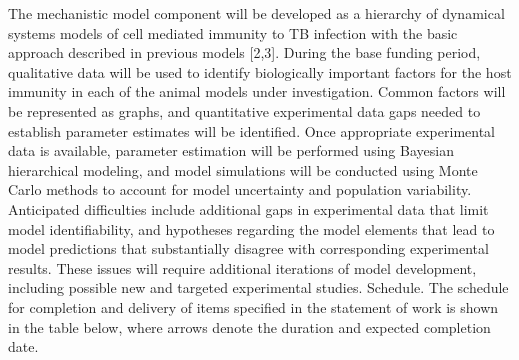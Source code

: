 \documentclass[]{book}
\begin{document}
The mechanistic model component will be developed as a hierarchy of
dynamical systems models of cell mediated immunity to TB infection with
the basic approach described in previous models {[}2,3{]}. During the
base funding period, qualitative data will be used to identify
biologically important factors for the host immunity in each of the
animal models under investigation. Common factors will be represented as
graphs, and quantitative experimental data gaps needed to establish
parameter estimates will be identified. Once appropriate experimental
data is available, parameter estimation will be performed using Bayesian
hierarchical modeling, and model simulations will be conducted using
Monte Carlo methods to account for model uncertainty and population
variability. Anticipated difficulties include additional gaps in
experimental data that limit model identifiability, and hypotheses
regarding the model elements that lead to model predictions that
substantially disagree with corresponding experimental results. These
issues will require additional iterations of model development,
including possible new and targeted experimental studies. Schedule. The
schedule for completion and delivery of items specified in the statement
of work is shown in the table below, where arrows denote the duration
and expected completion date.
\end{document}
